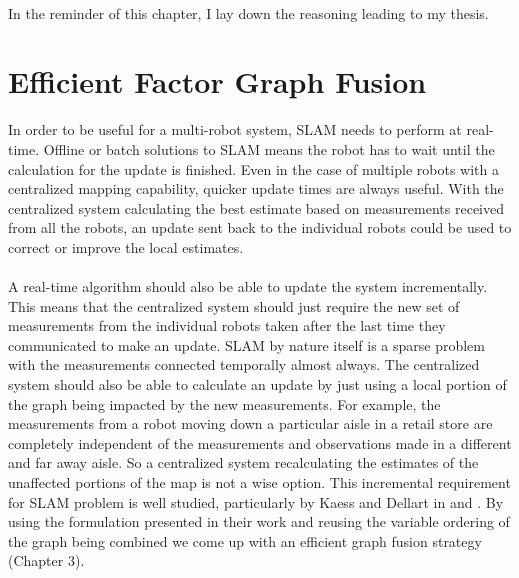 \paragraph{}
In the reminder of this chapter, I lay down the reasoning leading to my thesis.

\section{Efficient Factor Graph Fusion}
In order to be useful for a multi-robot system, SLAM needs to perform at real-time. Offline or batch solutions to SLAM means the robot has to wait until the calculation for the update is finished. Even in the case of multiple robots with a centralized mapping capability, quicker update times are always useful. With the centralized system calculating the best estimate based on measurements received from all the robots, an update sent back to the individual robots could be used to correct or improve the local estimates. 

\paragraph{}
A real-time algorithm should also be able to update the system incrementally. This means that the centralized system should just require the new set of measurements from the individual robots taken after the last time they communicated to make an update. SLAM by nature itself is a sparse problem with the measurements connected temporally almost always. The centralized system should also be able to calculate an update by just using a local portion of the graph being impacted by the new measurements. For example, the measurements from a robot moving down a particular aisle in a retail store are completely independent of the measurements and observations made in a different and far away aisle. So a centralized system recalculating the estimates of the unaffected portions of the map is not a wise option. This incremental requirement for SLAM problem is well studied, particularly by Kaess and Dellart in \cite{kaessisam} and \cite{kaessisam2}. By using the formulation presented in their work and reusing the variable ordering of the graph being combined we come up with an efficient graph fusion strategy (Chapter 3). 

